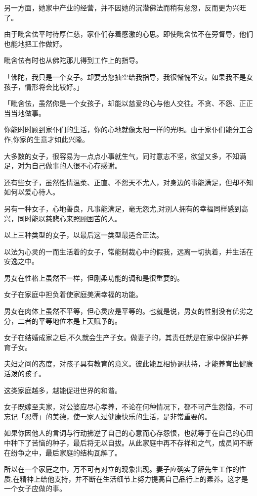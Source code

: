 \documentclass[twoside,openany]{book}
\begin{document}
另一方面，她家中产业的经营，并不因她的沉潜佛法而稍有怠忽，反而更为兴旺了。

由于毗舍佉平时待厚仁慈，家仆们存着感激的心思。即使毗舍佉不在旁督导，他们也能地把工作做好。

毗舍佉有时也从佛陀那儿得到工作上的指导。

「佛陀，我只是一个女子。却要劳您抽空给我指导，我很惭愧不安。如果我不是女孩子，情形将会比较好。」

「毗舍佉，虽然你是一个女孩子，却能以慈爱的心与他人交往。不贪、不怨、正正当当地做事。

你能时时顾到家仆们的生活，你的心地就像太阳一样的光明。由于家仆们能分工合作,你家的生意才如此兴隆。

大多数的女子，很容易为一点点小事就生气，同时意志不坚，欲望又多，不知满足，对为自己做事的人很不心存感谢。

还有些女子，虽然性情温柔、正直、不怨天不尤人，对身边的事能满足，但却不知如何以爱心待人。

另有一种女子，心地善良，凡事能满足，毫无怨尤,对别人拥有的幸福同样感到高兴，同时能以慈悲心来照顾困苦的人。

以上三种类型的女子，以最后这一类型最适合正法。

以法为心灵的一而生活着的女子，常能制裁心中的假我，远离一切执着，并生活在安逸之中。

男女在性格上虽然不一样，但刚柔功能的调和是很重要的。

女子在家庭中担负着使家庭美满幸福的功能。

男女在肉体上虽然不平等，但心灵应是平等的。也就是说，男女的性别没有优劣之分，二者的平等地位本是上天赋予的。

女子在结婚成家之后,不久就会生产子女。做妻子的，其责任就是在家中保护并养育子女。

夫妇之间的态度，对孩子具有教育的意义。彼此能互相协调扶持，才能养育出健康活泼的孩子。

这类家庭越多，越能促进世界的和谐。

女子既嫁至夫家，对公婆应尽心孝养，不论在何种情况下，都不可产生怨恼，不可忘记「忍辱」的美德，使一家人过健康快乐的生活，是非常重要的。

如果你因他人的言词与行动拂逆了自己的心意而心存怨恨，也就等于在自己的心田中种下了苦恼的种子，最后将无以自拔。从此家庭中再不存祥和之气，成员间不断在纷争之中，最后家庭的结构瓦解了。

所以在一个家庭之中，万不可有对立的现象出现。妻子应确实了解先生工作的性质,在精神上给他支持，并不断在生活细节上努力提高自己品行上的素养。这才是一个女子应做的事。
\end{document}

